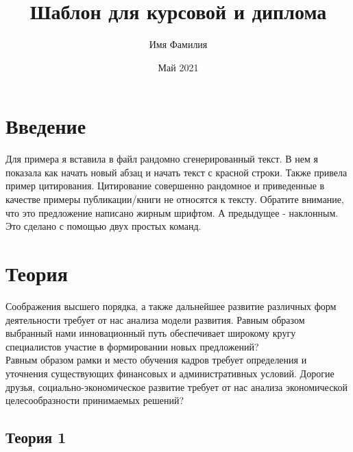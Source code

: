 \documentclass[12pt, oneside, a4paper]{article} %
\begin{document}

\title{Шаблон для курсовой и диплома} 
\author{Имя Фамилия}
\date{Май 2021}
\maketitle
\thispagestyle{empty} %

\newpage 
\tableofcontents

\begin{sloppypar} %
\newpage 
\section{Введение}
Для примера я вставила в файл рандомно сгенерированный текст. В нем я показала как начать новый абзац и начать текст с красной строки. Также привела пример цитирования. Цитирование совершенно рандомное и приведенные в качестве примеры публикации/книги не относятся к тексту.
Обратите внимание, что это предложение написано жирным шрифтом. А предыдущее - наклонным. Это сделано с помощью двух простых команд.

\section{Теория}
Соображения высшего порядка, а также дальнейшее развитие различных форм деятельности требует от нас анализа модели развития. Равным образом выбранный нами инновационный путь обеспечивает широкому кругу специалистов участие в формировании новых предложений?\\
Равным образом рамки и место обучения кадров требует определения и уточнения существующих финансовых и административных условий.
Дорогие друзья, социально-экономическое развитие требует от нас анализа экономической целесообразности принимаемых решений? \cite{kistyakovskii} %

\subsection{Теория 1}


\end{sloppypar}
\end{document}
